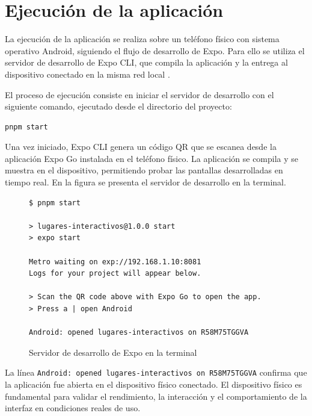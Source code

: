 
\section{Ejecuci\'on de la aplicaci\'on}

La ejecuci\'on de la aplicaci\'on se realiza sobre un tel\'efono f\'isico con
sistema operativo Android, siguiendo el flujo de desarrollo de Expo. Para ello
se utiliza el servidor de desarrollo de Expo CLI, que compila la aplicaci\'on y
la entrega al dispositivo conectado en la misma red local \citep{expo}.

El proceso de ejecuci\'on consiste en iniciar el servidor de desarrollo con el
siguiente comando, ejecutado desde el directorio del proyecto:

\begin{lstlisting}
pnpm start
\end{lstlisting}

Una vez iniciado, Expo CLI genera un c\'odigo QR que se escanea desde la
aplicaci\'on Expo Go instalada en el tel\'efono f\'isico. La aplicaci\'on se
compila y se muestra en el dispositivo, permitiendo probar las pantallas
desarrolladas en tiempo real. En la figura se presenta el servidor de
desarrollo en la terminal.

\begin{figure}[H]
\centering
  \caption{Servidor de desarrollo de Expo en la terminal}
  \label{fig:servidor-expo}
  \vspace{6pt}
  \begin{lstlisting}[style=terminal]
$ pnpm start

> lugares-interactivos@1.0.0 start
> expo start

Metro waiting on exp://192.168.1.10:8081
Logs for your project will appear below.

> Scan the QR code above with Expo Go to open the app.
> Press a | open Android

Android: opened lugares-interactivos on R58M75TGGVA
  \end{lstlisting}
  \par\raggedright{}\end{figure}

La l\'inea \texttt{Android: opened lugares-interactivos on R58M75TGGVA}
confirma que la aplicaci\'on fue abierta en el dispositivo f\'isico conectado.
El dispositivo f\'isico es fundamental para validar el rendimiento, la
interacci\'on y el comportamiento de la interfaz en condiciones reales de uso.

